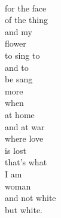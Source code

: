\documentclass[smalldemyvopaper,11pt,twoside,onecolumn,openright,extrafontsizes]{memoir}
\begin{document}
\\for the face
\\of the thing
\\and my
\\flower
\\to sing to
\\and to
\\be sang
\\more
\\when
\\at home
\\and at war
\\where love
\\is lost
\\that's what
\\I am
\\woman
\\and not white
\\but white.
\end{document}
